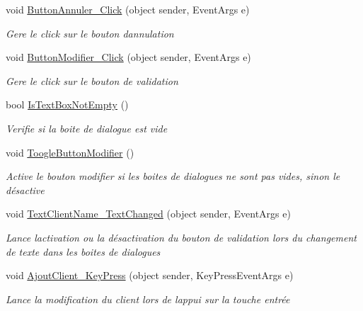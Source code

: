 \begin{DoxyCompactItemize}
\item 
void \mbox{\hyperlink{class_m_t_connect_agent_1_1_form_modifie_client_adfee7a9d6c7b0998a3e69cc2d78270b9}{Button\+Annuler\+\_\+\+Click}} (object sender, Event\+Args e)
\begin{DoxyCompactList}\small\item\em Gere le click sur le bouton d\textquotesingle{}annulation \end{DoxyCompactList}\item 
void \mbox{\hyperlink{class_m_t_connect_agent_1_1_form_modifie_client_a9f8a6bcb85f853db7f5dd344611c929a}{Button\+Modifier\+\_\+\+Click}} (object sender, Event\+Args e)
\begin{DoxyCompactList}\small\item\em Gere le click sur le bouton de validation \end{DoxyCompactList}\item 
bool \mbox{\hyperlink{class_m_t_connect_agent_1_1_form_modifie_client_a1b697af51beaa5f37e007ce69af0b04a}{Is\+Text\+Box\+Not\+Empty}} ()
\begin{DoxyCompactList}\small\item\em Verifie si la boite de dialogue est vide \end{DoxyCompactList}\item 
void \mbox{\hyperlink{class_m_t_connect_agent_1_1_form_modifie_client_acea5e363aa37894172a0a938292fa65f}{Toogle\+Button\+Modifier}} ()
\begin{DoxyCompactList}\small\item\em Active le bouton modifier si les boites de dialogues ne sont pas vides, sinon le désactive \end{DoxyCompactList}\item 
void \mbox{\hyperlink{class_m_t_connect_agent_1_1_form_modifie_client_aa0a81b7eec3c8090ff9653a1e39816fc}{Text\+Client\+Name\+\_\+\+Text\+Changed}} (object sender, Event\+Args e)
\begin{DoxyCompactList}\small\item\em Lance l\textquotesingle{}activation ou la désactivation du bouton de validation lors du changement de texte dans les boites de dialogues \end{DoxyCompactList}\item 
void \mbox{\hyperlink{class_m_t_connect_agent_1_1_form_modifie_client_a84cac38725cf7fc778c0fb983106cbb7}{Ajout\+Client\+\_\+\+Key\+Press}} (object sender, Key\+Press\+Event\+Args e)
\begin{DoxyCompactList}\small\item\em Lance la modification du client lors de l\textquotesingle{}appui sur la touche entrée \end{DoxyCompactList}\item 

\end{DoxyCompactItemize}
